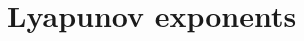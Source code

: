 \documentclass[letterpaper,12pt,preprint]{aastex}
\newcommand{\ident}{\mathbb{1}}
\begin{document}



\appendix
\section{Lyapunov exponents} \label{sec:lyapapdx}

\end{document}
